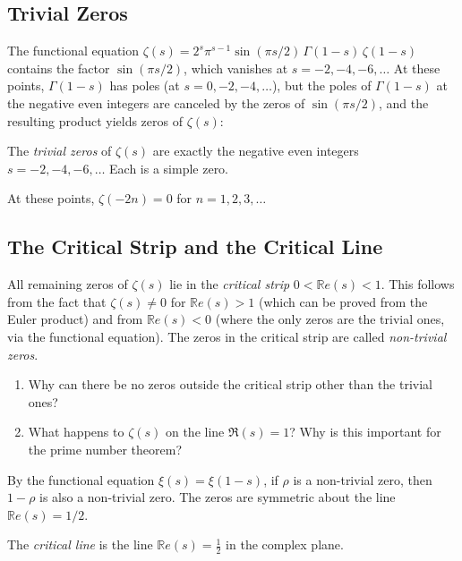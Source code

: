 \subsection{Trivial Zeros}

The functional equation $\zeta(s) = 2^s \pi^{s-1} \sin(\pi s / 2) \, \Gamma(1-s) \, \zeta(1-s)$ contains the factor $\sin(\pi s / 2)$, which vanishes at $s = -2, -4, -6, \ldots$ At these points, $\Gamma(1-s)$ has poles (at $s = 0, -2, -4, \ldots$), but the poles of $\Gamma(1-s)$ at the negative even integers are canceled by the zeros of $\sin(\pi s / 2)$, and the resulting product yields zeros of $\zeta(s)$:

\begin{theorem}
The \textit{trivial zeros} of $\zeta(s)$ are exactly the negative even integers $s = -2, -4, -6, \ldots$ Each is a simple zero.
\end{theorem}

At these points, $\zeta(-2n) = 0$ for $n = 1, 2, 3, \ldots$

\subsection{The Critical Strip and the Critical Line}

All remaining zeros of $\zeta(s)$ lie in the \textit{critical strip} $0 < \mathbb{R}e(s) < 1$. This follows from the fact that $\zeta(s) \neq 0$ for $\mathbb{R}e(s) > 1$ (which can be proved from the Euler product) and from $\mathbb{R}e(s) < 0$ (where the only zeros are the trivial ones, via the functional equation). The zeros in the critical strip are called \textit{non-trivial zeros}.

\begin{checkyou}
\begin{enumerate}
  \item Why can there be no zeros outside the critical strip other than the trivial ones?
  \item What happens to $\zeta(s)$ on the line $\Re(s) = 1$? Why is this important for the prime number theorem?
\end{enumerate}
\end{checkyou}

By the functional equation $\xi(s) = \xi(1-s)$, if $\rho$ is a non-trivial zero, then $1 - \rho$ is also a non-trivial zero. The zeros are symmetric about the line $\mathbb{R}e(s) = 1/2$.

\begin{definition}
The \textit{critical line} is the line $\mathbb{R}e(s) = \frac{1}{2}$ in the complex plane.
\end{definition}

